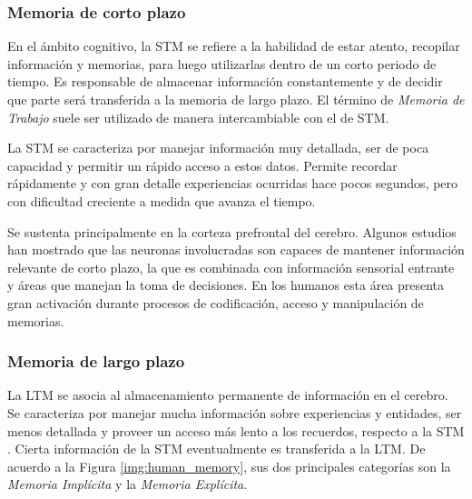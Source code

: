 

\subsubsection{Memoria de corto plazo}
En el ámbito cognitivo, la STM se refiere a la habilidad de estar atento, recopilar información  y memorias, para luego utilizarlas dentro de un corto periodo de tiempo. Es responsable de almacenar información constantemente y de decidir que parte será transferida a la memoria de largo plazo. El término de \textit{Memoria de Trabajo} suele ser utilizado de manera intercambiable con el de STM.

La STM se caracteriza por manejar información muy detallada, ser de poca capacidad y permitir un rápido acceso a estos datos. Permite recordar rápidamente y con gran detalle experiencias ocurridas hace pocos segundos, pero con dificultad creciente a medida que avanza el tiempo.

Se sustenta principalmente en la corteza prefrontal del cerebro. Algunos estudios han mostrado que las neuronas involucradas son capaces de mantener información relevante de corto plazo, la que es combinada con información sensorial entrante y áreas que manejan la toma de decisiones. %
En los humanos esta área presenta gran activación durante procesos de codificación, acceso y manipulación de memorias. %


\subsubsection{Memoria de largo plazo}
La LTM se asocia al almacenamiento permanente de información en el cerebro. Se caracteriza por manejar mucha información sobre experiencias y entidades, ser menos detallada y proveer un acceso más lento a los recuerdos, respecto a la STM \cite{Eichenbaum:2008}. Cierta información de la STM eventualmente es transferida a la LTM. De acuerdo a la Figura \ref{img:human_memory}, sus dos principales categorías son la \textit{Memoria Implícita} y la \textit{Memoria Explícita}.


